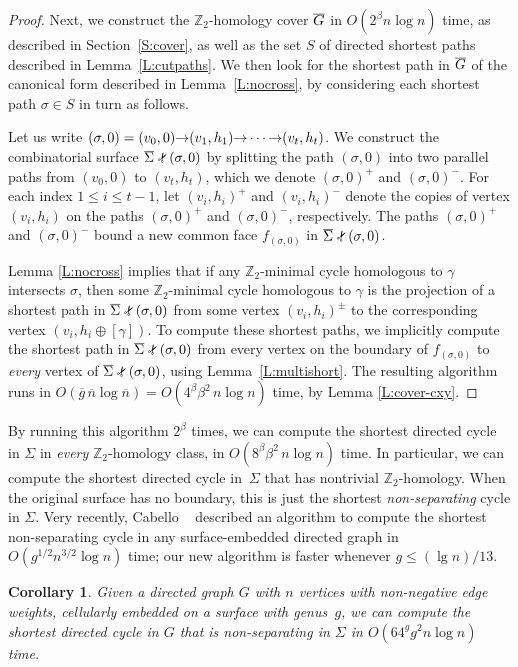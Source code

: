 \documentclass[twoside,leqno,twocolumn]{article}
\def\arcto{\mathord\shortrightarrow}
\def\Z{\mathbb{Z}}
\def\snip{\mathbin{\raisebox{0.15ex}{\rotatebox[origin=c]{60}{\Rightscissors}\!}}}
\let\cycle\gamma
\def\Sigmabar{\overline{\smash{\Sigma}\vphantom{t}}}
\def\Gbar{\overline{\smash{G}\vphantom{t}}}
\def\nbar{\overline{n}}
\def\gbar{\overline{g}}
\newtheorem{corollary}[theorem]{Corollary}
\begin{document}
{\begin{proof}
Next, we construct the $\Z_2$-homology cover $\Gbar$ in $O(2^\beta n\log n)$ time, as described in Section~\ref{S:cover}, as well as the set $S$ of directed shortest paths described in Lemma~\ref{L:cutpaths}.  We then look for the shortest path in $\Gbar$ of the canonical form described in Lemma~\ref{L:nocross}, by considering each shortest path $\sigma\in S$ in turn as follows.

Let us write $(\sigma,0) = (v_0,0) \arcto (v_1,h_1) \arcto\allowbreak \cdots\arcto (v_t, h_t)$.  We construct the combinatorial surface $\Sigmabar\snip(\sigma,0)$ by splitting the path $(\sigma,0)$ into two parallel paths from $(v_0,0)$ to $(v_t,h_t)$, which we denote  $(\sigma,0)^+$ and $(\sigma,0)^-$.  For each index $1\le i\le t-1$, let $(v_i,h_i)^+$ and $(v_i,h_i)^-$ denote the copies of vertex $(v_i,h_i)$  on the paths $(\sigma,0)^+$ and $(\sigma,0)^-$, respectively.  The paths $(\sigma,0)^+$ and $(\sigma,0)^-$ bound a new common face $f_{(\sigma,0)}$ in $\Sigmabar\snip(\sigma,0)$.

Lemma \ref{L:nocross} implies that if any $\Z_2$-minimal cycle homologous to $\cycle$ intersects $\sigma$, then some $\Z_2$-minimal cycle homologous to $\cycle$ is the projection of a shortest path in $\Sigmabar\snip(\sigma,0)$ from some vertex $(v_i,h_i)^\pm$ to the corresponding vertex $(v_i, h_i\oplus[\cycle])$.  To compute these shortest paths, we implicitly compute the shortest path in $\Sigmabar\snip(\sigma,0)$ from every vertex on the boundary of $f_{(\sigma,0)}$ to \emph{every} vertex of $\Sigmabar\snip(\sigma,0)$, using Lemma~\ref{L:multishort}.  The resulting algorithm runs in $O(\gbar\,\nbar \log \nbar) = O(4^\beta \beta^2\, n\log n)$ time, by Lemma \ref{L:cover-cxy}.
\end{proof}

By running this algorithm $2^\beta$ times, we can compute the shortest directed cycle in $\Sigma$ in \emph{every} $\Z_2$-homology class, in $O(8^\beta \beta^2\, n\log n)$ time.  In particular, we can compute the shortest directed cycle in~$\Sigma$ that has nontrivial $\Z_2$-homology.  When the original surface has no boundary, this is just the shortest \emph{non-separating} cycle in $\Sigma$.  Very recently, Cabello \etal~\cite{ccl-fsncd-10} described an algorithm to compute the shortest non-separating cycle in any surface-embedded directed graph in $O(g^{1/2} n^{3/2}\log n)$ time; our new algorithm is faster whenever $g \le (\lg n)/13$.

\begin{corollary}
\label{C:nonsep}
Given a directed graph $G$ with $n$ vertices with non-negative edge weights, cellularly embedded on a surface with genus~$g$, we can compute the shortest directed cycle in $G$ that is non-separating in $\Sigma$ in $O(64^g g^2 n\log n)$ time.
\end{corollary}

}
\end{document}
